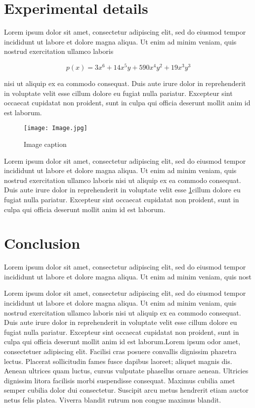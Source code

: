 \documentclass[final,3p,times,twocolumn]{elsarticle}
\begin{document}
\section{Experimental details}

Lorem ipsum dolor sit amet, consectetur adipiscing elit, sed do eiusmod tempor incididunt ut labore et dolore magna aliqua. Ut enim ad minim veniam, quis nostrud exercitation ullamco laboris

\begin{equation}
p(x) = 3x^6 + 14x^5y + 590x^4y^2 + 19x^3y^3
\end{equation}

nisi ut aliquip ex ea commodo consequat. Duis aute irure dolor in reprehenderit in voluptate velit esse cillum dolore eu fugiat nulla pariatur. Excepteur sint occaecat cupidatat non proident, sunt in culpa qui officia deserunt mollit anim id est laborum.
\begin{figure}
\centering
\texttt{[image: Image.jpg]}
\caption{Image caption}
\label{Fig:Image1}
\end{figure}   

Lorem ipsum dolor sit amet, consectetur adipiscing elit, sed do eiusmod tempor incididunt ut labore et dolore magna aliqua. Ut enim ad minim veniam, quis nostrud exercitation ullamco laboris nisi ut aliquip ex ea commodo consequat. Duis aute irure dolor in reprehenderit in voluptate velit esse \ref{Fig:Image1}cillum dolore eu fugiat nulla pariatur. Excepteur sint occaecat cupidatat non proident, sunt in culpa qui officia deserunt mollit anim id est laborum.

\section{Conclusion}

Lorem ipsum dolor sit amet, consectetur adipiscing elit, sed do eiusmod tempor incididunt ut labore et dolore magna aliqua. Ut enim ad minim veniam, quis nost

Lorem ipsum dolor sit amet, consectetur adipiscing elit, sed do eiusmod tempor incididunt ut labore et dolore magna aliqua. Ut enim ad minim veniam, quis nostrud exercitation ullamco laboris nisi ut aliquip ex ea commodo consequat. Duis aute irure dolor in reprehenderit in voluptate velit esse cillum dolore eu fugiat nulla pariatur. Excepteur sint occaecat cupidatat non proident, sunt in culpa qui officia deserunt mollit anim id est laborum.Lorem ipsum odor amet, consectetuer adipiscing elit. Facilisi cras posuere convallis dignissim pharetra lectus. Placerat sollicitudin fames fusce dapibus laoreet; aliquet magnis dis. Aenean ultrices quam luctus, cursus vulputate phasellus ornare aenean. Ultricies dignissim litora facilisis morbi suspendisse consequat. Maximus cubilia amet semper cubilia dolor dui consectetur. Suscipit arcu metus hendrerit etiam auctor netus felis platea. Viverra blandit rutrum non congue maximus blandit.
\end{document}
